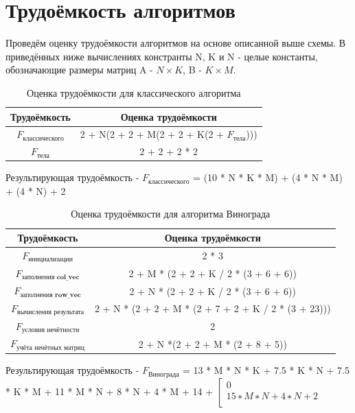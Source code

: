 \section{Трудоёмкость алгоритмов}
Проведём оценку трудоёмкости алгоритмов на основе описанной выше схемы. В приведённых ниже вычислениях констранты N, K и N - целые константы, обозначающие размеры матриц A - $N \times K$, B - $K \times M$. 

\begin{table}[h!]
  \begin{center}
    \captionsetup{justification=raggedright}
    \caption{Оценка трудоёмкости для классического алгоритма}
    \label{tab:workcost_classic}
    \begin{tabular}{c|c}
      \textbf{Трудоёмкость} & \textbf{Оценка трудоёмкости}\\
      \hline
	$F_{\text{классического}}$ & 2 + N(2 + 2 + M(2 + 2 + K(2 + $F_{\text{тела}}$)))\\
	$F_{\text{тела}}$ & 2 + 2 + 2 * 2
    \end{tabular}
  \end{center}
\end{table}
Результирующая трудоёмкость - $F_{\text{классического}}$ = (10 * N * K * M) + (4 * N * M) + (4 * N) + 2

\begin{table}[h!]
  \begin{center}
    \captionsetup{justification=raggedright}
    \caption{Оценка трудоёмкости для алгоритма Винограда}
    \label{tab:workcost_classic}
    \begin{tabular}{c|c}
      \textbf{Трудоёмкость} & \textbf{Оценка трудоёмкости}\\
      \hline
	$F_{\textbf{инициализации}}$ & 2 * 3\\
	$F_{\textbf{заполнения col\_vec}}$ & 2 + M * (2 + 2 + K / 2 * (3 + 6 + 6))\\
	$F_{\textbf{заполнения row\_vec}}$ & 2 + N * (2 + 2 + K / 2 * (3 + 6 + 6))\\
	$F_{\textbf{вычисления результата}}$ & 2 + N * (2 + 2 + M * (2 + 7 + 2 + K / 2 * (3 + 23)))\\
	$F_{\textbf{условия нечётности}}$ & 2\\
	$F_{\textbf{учёта нечётных матриц}}$ & 2 + N *(2 + 2 + M * (2 + 8 + 5))
    \end{tabular}
  \end{center}
\end{table}
Результирующая трудоёмкость - $F_{\text{Винограда}}$ = 13 * M * N * K + 7.5 * K * N + 7.5 * K * M + 11 * M * N + 8 * N + 4 * M + 14 + 
$\left[ 
  \begin{array}{c}
    0 \\
    15 ∗ M ∗ N + 4 ∗ N + 2 \\
  \end{array}
\right.$


